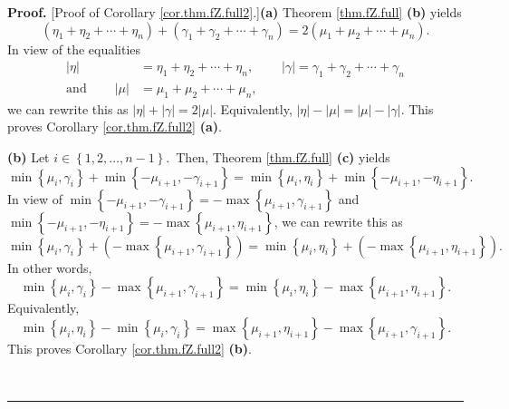 \documentclass[numbers=enddot,12pt,final,onecolumn,notitlepage]{scrartcl}%
\theoremstyle{definition}
\newenvironment{proof}[1][Proof]{\noindent\textbf{#1.} }{\ \rule{0.5em}{0.5em}}
\begin{document}
\begin{proof}
[Proof of Corollary \ref{cor.thm.fZ.full2}.]\textbf{(a)} Theorem
\ref{thm.fZ.full} \textbf{(b)} yields%
\[
\left(  \eta_{1}+\eta_{2}+\cdots+\eta_{n}\right)  +\left(  \gamma_{1}%
+\gamma_{2}+\cdots+\gamma_{n}\right)  =2\left(  \mu_{1}+\mu_{2}+\cdots+\mu
_{n}\right)  .
\]
In view of the equalities%
\begin{align*}
\left\vert \eta\right\vert  &  =\eta_{1}+\eta_{2}+\cdots+\eta_{n}%
,\ \ \ \ \ \ \ \ \ \ \left\vert \gamma\right\vert =\gamma_{1}+\gamma
_{2}+\cdots+\gamma_{n}\\
\text{and}\ \ \ \ \ \ \ \ \ \ \left\vert \mu\right\vert  &  =\mu_{1}+\mu
_{2}+\cdots+\mu_{n},
\end{align*}
we can rewrite this as $\left\vert \eta\right\vert +\left\vert \gamma
\right\vert =2\left\vert \mu\right\vert $. Equivalently, $\left\vert
\eta\right\vert -\left\vert \mu\right\vert =\left\vert \mu\right\vert
-\left\vert \gamma\right\vert $. This proves Corollary \ref{cor.thm.fZ.full2}
\textbf{(a)}.

\textbf{(b)} Let $i\in\left\{  1,2,\ldots,n-1\right\}  $.\ Then, Theorem
\ref{thm.fZ.full} \textbf{(c)} yields%
\[
\min\left\{  \mu_{i},\gamma_{i}\right\}  +\min\left\{  -\mu_{i+1}%
,-\gamma_{i+1}\right\}  =\min\left\{  \mu_{i},\eta_{i}\right\}  +\min\left\{
-\mu_{i+1},-\eta_{i+1}\right\}  .
\]
In view of $\min\left\{  -\mu_{i+1},-\gamma_{i+1}\right\}  =-\max\left\{
\mu_{i+1},\gamma_{i+1}\right\}  $ and $\min\left\{  -\mu_{i+1},-\eta
_{i+1}\right\}  =-\max\left\{  \mu_{i+1},\eta_{i+1}\right\}  $, we can rewrite
this as%
\[
\min\left\{  \mu_{i},\gamma_{i}\right\}  +\left(  -\max\left\{  \mu
_{i+1},\gamma_{i+1}\right\}  \right)  =\min\left\{  \mu_{i},\eta_{i}\right\}
+\left(  -\max\left\{  \mu_{i+1},\eta_{i+1}\right\}  \right)  .
\]
In other words,%
\[
\min\left\{  \mu_{i},\gamma_{i}\right\}  -\max\left\{  \mu_{i+1},\gamma
_{i+1}\right\}  =\min\left\{  \mu_{i},\eta_{i}\right\}  -\max\left\{
\mu_{i+1},\eta_{i+1}\right\}  .
\]
Equivalently,%
\[
\min\left\{  \mu_{i},\eta_{i}\right\}  -\min\left\{  \mu_{i},\gamma
_{i}\right\}  =\max\left\{  \mu_{i+1},\eta_{i+1}\right\}  -\max\left\{
\mu_{i+1},\gamma_{i+1}\right\}  .
\]
This proves Corollary \ref{cor.thm.fZ.full2} \textbf{(b)}.


\end{proof}
\end{document}
